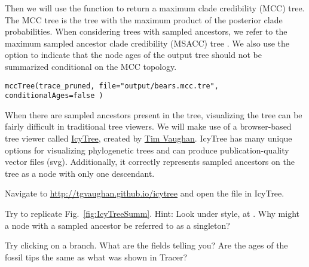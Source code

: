 Then we will use the  function to return a maximum clade credibility (MCC) tree.
The MCC tree is the tree with the maximum product of the posterior clade probabilities.
When considering trees with sampled ancestors, we refer to the maximum sampled ancestor clade credibility (MSACC) tree \citep{Gavryushkina2016}.
We also use the option  to indicate that the node ages of the output tree should not be summarized conditional on the MCC topology.
{\tt \begin{snugshade*}
\begin{lstlisting}
mccTree(trace_pruned, file="output/bears.mcc.tre", conditionalAges=false )
\end{lstlisting}
\end{snugshade*}}


When there are sampled ancestors present in the tree, visualizing the tree can be fairly difficult in traditional tree viewers.
We will make use of a browser-based tree viewer called \href{http://tgvaughan.github.io/icytree/}{IcyTree}, created by \href{https://github.com/tgvaughan}{Tim Vaughan}.
IcyTree has many unique options for visualizing phylogenetic trees and can produce publication-quality vector files (\IE svg). 
Additionally, it correctly represents sampled ancestors on the tree as a node with only one descendant. 

{\begin{framed}
Navigate to \url{http://tgvaughan.github.io/icytree} and open the file  in IcyTree.

Try to replicate Fig.\ \ref{fig:IcyTreeSumm}. Hint: Look under style, at .
Why might a node with a sampled ancestor be referred to as a singleton?

Try clicking on a branch.
What are the fields telling you?
Are the ages of the fossil tips the same as what was shown in Tracer? 
\end{framed}}




\begin{figure}[h!]
\label{fig:IcyTreeScreenshort}
\end{figure}

